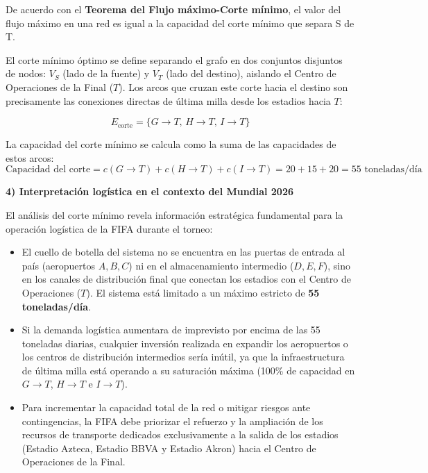 De acuerdo con el \textbf{Teorema del Flujo máximo-Corte mínimo}, el valor del flujo máximo en una red es igual a la capacidad del corte mínimo que separa S de T. 

El corte mínimo óptimo se define separando el grafo en dos conjuntos disjuntos de nodos: $V_S$ (lado de la fuente) y $V_T$ (lado del destino), aislando el Centro de Operaciones de la Final ($T$). Los arcos que cruzan este corte hacia el destino son precisamente las conexiones directas de última milla desde los estadios hacia $T$:

\[
E_{\text{corte}} = \{ G \rightarrow T,\, H \rightarrow T,\, I \rightarrow T \}
\]

La capacidad del corte mínimo se calcula como la suma de las capacidades de estos arcos:
\[
\text{Capacidad del corte} = c(G \rightarrow T) + c(H \rightarrow T) + c(I \rightarrow T) = 20 + 15 + 20 = 55 \text{ toneladas/día}
\]

\textbf{4) Interpretación logística en el contexto del Mundial 2026}

El análisis del corte mínimo revela información estratégica fundamental para la operación logística de la FIFA durante el torneo:

\begin{itemize}
    \item El cuello de botella del sistema no se encuentra en las puertas de entrada al país (aeropuertos $A, B, C$) ni en el almacenamiento intermedio ($D, E, F$), sino en los canales de distribución final que conectan los estadios con el Centro de Operaciones ($T$). El sistema está limitado a un máximo estricto de \textbf{55 toneladas/día}.
    \item Si la demanda logística aumentara de imprevisto por encima de las 55 toneladas diarias, cualquier inversión realizada en expandir los aeropuertos o los centros de distribución intermedios sería inútil, ya que la infraestructura de última milla está operando a su saturación máxima (100\% de capacidad en $G \rightarrow T$, $H \rightarrow T$ e $I \rightarrow T$).
    \item Para incrementar la capacidad total de la red o mitigar riesgos ante contingencias, la FIFA debe priorizar el refuerzo y la ampliación de los recursos de transporte dedicados exclusivamente a la salida de los estadios (Estadio Azteca, Estadio BBVA y Estadio Akron) hacia el Centro de Operaciones de la Final.
\end{itemize}

